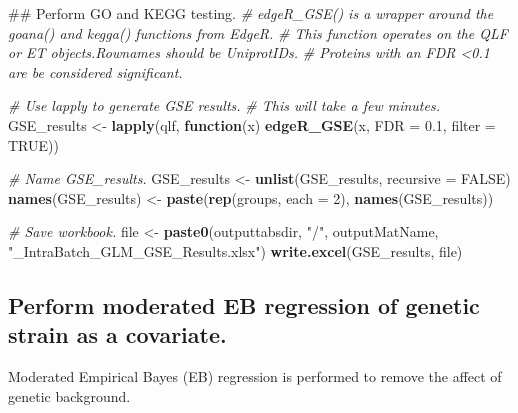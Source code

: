 \documentclass[]{article}
\newenvironment{Shaded}{\begin{snugshade}}{\end{snugshade}}
\newcommand{\KeywordTok}[1]{\textcolor[rgb]{0.13,0.29,0.53}{\textbf{#1}}}
\newcommand{\DataTypeTok}[1]{\textcolor[rgb]{0.13,0.29,0.53}{#1}}
\newcommand{\DecValTok}[1]{\textcolor[rgb]{0.00,0.00,0.81}{#1}}
\newcommand{\FloatTok}[1]{\textcolor[rgb]{0.00,0.00,0.81}{#1}}
\newcommand{\StringTok}[1]{\textcolor[rgb]{0.31,0.60,0.02}{#1}}
\newcommand{\CommentTok}[1]{\textcolor[rgb]{0.56,0.35,0.01}{\textit{#1}}}
\newcommand{\OtherTok}[1]{\textcolor[rgb]{0.56,0.35,0.01}{#1}}
\newcommand{\ControlFlowTok}[1]{\textcolor[rgb]{0.13,0.29,0.53}{\textbf{#1}}}
\newcommand{\NormalTok}[1]{#1}
\begin{document}
\begin{Shaded}
\begin{Highlighting}[]
\NormalTok{## Perform GO and KEGG testing.}
\CommentTok{# edgeR_GSE() is a wrapper around the goana() and kegga() functions from EdgeR.}
\CommentTok{# This function operates on the QLF or ET objects.Rownames should be UniprotIDs.}
\CommentTok{# Proteins with an FDR <0.1 are be considered significant.}

\CommentTok{# Use lapply to generate GSE results.}
\CommentTok{# This will take a few minutes.}
\NormalTok{GSE_results <-}\StringTok{ }\KeywordTok{lapply}\NormalTok{(qlf, }\ControlFlowTok{function}\NormalTok{(x) }\KeywordTok{edgeR_GSE}\NormalTok{(x, }\DataTypeTok{FDR =} \FloatTok{0.1}\NormalTok{, }\DataTypeTok{filter =} \OtherTok{TRUE}\NormalTok{))}

\CommentTok{# Name GSE_results.}
\NormalTok{GSE_results <-}\StringTok{ }\KeywordTok{unlist}\NormalTok{(GSE_results, }\DataTypeTok{recursive =} \OtherTok{FALSE}\NormalTok{)}
\KeywordTok{names}\NormalTok{(GSE_results) <-}\StringTok{ }\KeywordTok{paste}\NormalTok{(}\KeywordTok{rep}\NormalTok{(groups, }\DataTypeTok{each =} \DecValTok{2}\NormalTok{), }\KeywordTok{names}\NormalTok{(GSE_results))}

\CommentTok{# Save workbook.}
\NormalTok{file <-}\StringTok{ }\KeywordTok{paste0}\NormalTok{(outputtabsdir, }\StringTok{"/"}\NormalTok{, outputMatName, }\StringTok{"_IntraBatch_GLM_GSE_Results.xlsx"}\NormalTok{)}
\KeywordTok{write.excel}\NormalTok{(GSE_results, file)}
\end{Highlighting}
\end{Shaded}

\subsection{Perform moderated EB regression of genetic strain as a
covariate.}\label{perform-moderated-eb-regression-of-genetic-strain-as-a-covariate.}

Moderated Empirical Bayes (EB) regression is performed to remove the
affect of genetic background.
\end{document}
